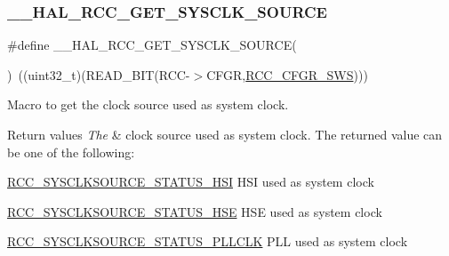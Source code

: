 \subsubsection{\texorpdfstring{\+\_\+\+\_\+\+H\+A\+L\+\_\+\+R\+C\+C\+\_\+\+G\+E\+T\+\_\+\+S\+Y\+S\+C\+L\+K\+\_\+\+S\+O\+U\+R\+CE}{\_\_HAL\_RCC\_GET\_SYSCLK\_SOURCE}}
{\footnotesize\ttfamily \#define \+\_\+\+\_\+\+H\+A\+L\+\_\+\+R\+C\+C\+\_\+\+G\+E\+T\+\_\+\+S\+Y\+S\+C\+L\+K\+\_\+\+S\+O\+U\+R\+CE(\begin{DoxyParamCaption}{ }\end{DoxyParamCaption})~((uint32\+\_\+t)(R\+E\+A\+D\+\_\+\+B\+IT(R\+CC-\/$>$C\+F\+GR,\hyperlink{group___peripheral___registers___bits___definition_ga15bf2269500dc97e137315f44aa015c9}{R\+C\+C\+\_\+\+C\+F\+G\+R\+\_\+\+S\+WS})))}



Macro to get the clock source used as system clock. 


\begin{DoxyRetVals}{Return values}
{\em The} & clock source used as system clock. The returned value can be one of the following\+: \begin{DoxyItemize}
\item \hyperlink{group___r_c_c___system___clock___source___status_ga0d6c2b0b2d59e6591295649853bb2abd}{R\+C\+C\+\_\+\+S\+Y\+S\+C\+L\+K\+S\+O\+U\+R\+C\+E\+\_\+\+S\+T\+A\+T\+U\+S\+\_\+\+H\+SI} H\+SI used as system clock \item \hyperlink{group___r_c_c___system___clock___source___status_ga3847769265bf19becf7b976a7e908a64}{R\+C\+C\+\_\+\+S\+Y\+S\+C\+L\+K\+S\+O\+U\+R\+C\+E\+\_\+\+S\+T\+A\+T\+U\+S\+\_\+\+H\+SE} H\+SE used as system clock \item \hyperlink{group___r_c_c___system___clock___source___status_ga4f05019ec09da478d084f44dbaad7d6d}{R\+C\+C\+\_\+\+S\+Y\+S\+C\+L\+K\+S\+O\+U\+R\+C\+E\+\_\+\+S\+T\+A\+T\+U\+S\+\_\+\+P\+L\+L\+C\+LK} P\+LL used as system clock \end{DoxyItemize}
\\
\hline
\end{DoxyRetVals}
\mbox{\label{group___r_c_c___get___clock__source_gaa29be28740b3d480e83efbc2e695c1b8}} 
